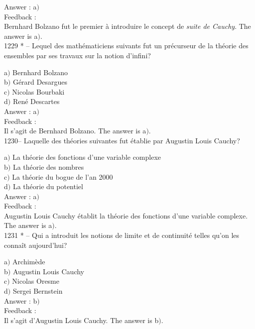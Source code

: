 ﻿\documentclass[letterpaper, 12pt]{article}
\begin{document}
Answer : a$)$\\

Feedback : \\
Bernhard Bolzano fut le premier \`a introduire le concept de {\sl
suite de Cauchy}.
The answer is a$)$.\\

1229 * -- Lequel des math\'ematiciens suivants fut un pr\'ecurseur
de la th\'eorie des ensembles par ses travaux sur la notion
d'infini?

a$)$ Bernhard Bolzano \\
b$)$ G\'erard Desargues \\
c$)$ Nicolas Bourbaki \\
d$)$ Ren\'e Descartes\\

Answer : a$)$\\

Feedback : \\
Il s'agit de Bernhard Bolzano.
The answer is a$)$.\\

1230-- Laquelle des th\'eories suivantes fut \'etablie par Augustin
Louis Cauchy?

a$)$ La th\'eorie des fonctions d'une variable complexe \\
b$)$ La th\'eorie des nombres \\
c$)$ La th\'eorie du bogue de l'an 2000 \\
d$)$ La th\'eorie du potentiel\\

Answer : a$)$\\

Feedback : \\
Augustin Louis Cauchy \'etablit la th\'eorie des fonctions d'une
variable complexe.
The answer is a$)$.\\

1231 * -- Qui a introduit les notions de limite et de continuit\'e
telles qu'on les conna\^it aujourd'hui?

a$)$ Archim\`ede \\
b$)$ Augustin Louis Cauchy \\
c$)$ Nicolas Oresme \\
d$)$ Sergei Bernstein\\

Answer : b$)$\\

Feedback : \\
Il s'agit d'Augustin Louis Cauchy.
The answer is b$)$.\\
\end{document}
